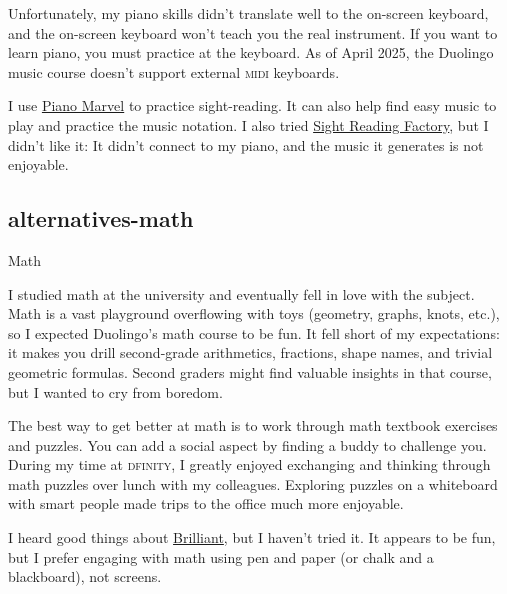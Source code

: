 \documentclass{article}
\begin{document}
Unfortunately, my piano skills didn't translate well to the on-screen keyboard,
and the on-screen keyboard won't teach you the real instrument.
If you want to learn piano, you must practice at the keyboard.
As of April 2025, the Duolingo music course doesn't support external \textsc{midi} keyboards.

I use \href{https://pianomarvel.com/}{Piano Marvel} to practice sight-reading.
It can also help find easy music to play and practice the music notation.
I also tried \href{https://www.sightreadingfactory.com/}{Sight Reading Factory}, but I didn't like it:
It didn't connect to my piano, and the music it generates is not enjoyable.

\subsection{alternatives-math}{Math}

I studied math at the university and eventually fell in love with the subject.
Math is a vast playground overflowing with toys (geometry, graphs, knots, etc.),
so I expected Duolingo's math course to be fun.
It fell short of my expectations:
it makes you drill second-grade arithmetics, fractions, shape names, and trivial geometric formulas.
Second graders might find valuable insights in that course,
but I wanted to cry from boredom.

The best way to get better at math is to work through math textbook exercises and puzzles.
You can add a social aspect by finding a buddy to challenge you.
During my time at \textsc{dfinity}, I greatly enjoyed exchanging and thinking through math puzzles over lunch with my colleagues.
Exploring puzzles on a whiteboard with smart people made trips to the office much more enjoyable.

I heard good things about \href{https://brilliant.org}{Brilliant}, but I haven't tried it.
It appears to be fun, but I prefer engaging with math using pen and paper (or chalk and a blackboard), not screens.
\end{document}
